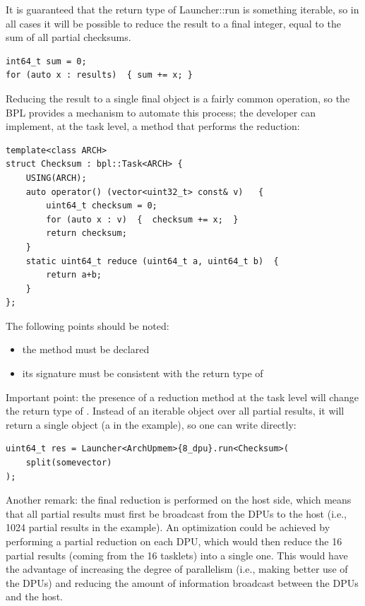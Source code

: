It is guaranteed that the return type of Launcher::run is something iterable, so in all cases it will be possible  to reduce the result to a final integer, equal to the sum of all partial checksums.
\begin{verbatim}
int64_t sum = 0;
for (auto x : results)  { sum += x; }
\end{verbatim}

Reducing the result to a single final object is a fairly common operation, so the BPL provides a mechanism to automate this process;  the developer can implement, at the task level, a  method that performs the reduction:

\begin{verbatim}
template<class ARCH>
struct Checksum : bpl::Task<ARCH> {
    USING(ARCH);
    auto operator() (vector<uint32_t> const& v)   {
        uint64_t checksum = 0;
        for (auto x : v)  {  checksum += x;  }
        return checksum;
    }
    static uint64_t reduce (uint64_t a, uint64_t b)  { 
        return a+b; 
    }
};
\end{verbatim}

The following points should be noted:

\begin{itemize}
	\item the  method must be declared 
	\item its signature must be consistent with the return type of 
\end{itemize}

Important point: the presence of a reduction method at the task level will change the return type of .  Instead of an iterable object over all partial results, it will return a single object (a  in the example),  so one can write directly:

\begin{verbatim}
uint64_t res = Launcher<ArchUpmem>{8_dpu}.run<Checksum>(
    split(somevector)
);
\end{verbatim}

Another remark: the final reduction is performed on the host side, which means that all partial results must first be broadcast  from the DPUs to the host (i.e., 1024 partial results in the  example).  An optimization could be achieved by performing a partial reduction on each DPU, which would then reduce the 16 partial results  (coming from the 16 tasklets) into a single one.  This would have the advantage of increasing the degree of parallelism (i.e., making better use of the DPUs)  and reducing the amount of information broadcast between the DPUs and the host.

